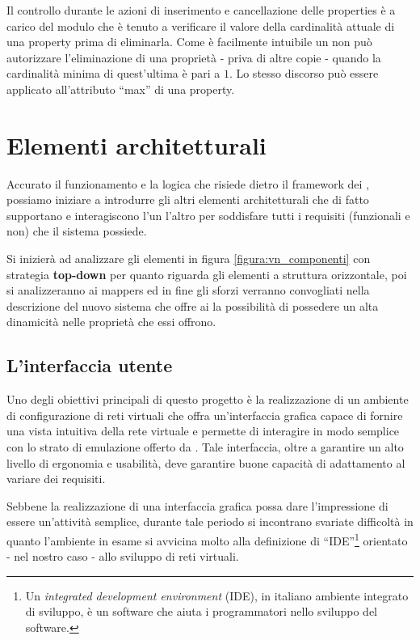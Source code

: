 Il controllo durante le azioni di inserimento e cancellazione delle properties è a carico del modulo che è tenuto a verificare il valore della cardinalità attuale di una property prima di eliminarla. Come è facilmente intuibile un \plugin{} non può autorizzare l'eliminazione di una proprietà - priva di altre copie - quando la cardinalità minima di quest'ultima è pari a $1$. Lo stesso discorso può essere applicato all'attributo ``max'' di una property.

\section{Elementi architetturali}
Accurato il funzionamento e la logica che risiede dietro il framework dei \plugin{}, possiamo iniziare a introdurre gli altri elementi architetturali che di fatto supportano e interagiscono l'un l'altro per soddisfare tutti i requisiti (funzionali e non) che il sistema possiede.

Si inizierà ad analizzare gli elementi in figura \ref{figura:vn_componenti} con strategia \textbf{top-down} per quanto riguarda gli elementi a struttura orizzontale, poi si analizzeranno ai mappers ed in fine gli sforzi verranno convogliati nella descrizione del nuovo sistema che offre ai \plugin{} la possibilità di possedere un alta dinamicità nelle proprietà che essi offrono.

\subsection{L'interfaccia utente}
Uno degli obiettivi principali di questo progetto è la realizzazione di un ambiente di configurazione di reti virtuali che offra un'interfaccia grafica capace di fornire una vista intuitiva della rete virtuale  e permette di interagire in modo semplice con lo strato di emulazione offerto da \netkit{}.
Tale interfaccia, oltre a garantire un alto livello di ergonomia e usabilità, deve garantire buone capacità di adattamento al variare dei requisiti.

Sebbene la realizzazione di una interfaccia grafica possa dare l'impressione di essere un'attività semplice, durante tale periodo si incontrano svariate difficoltà in quanto l'ambiente in esame si avvicina molto alla definizione di ``IDE''\footnote{Un \textit{integrated development environment} (IDE), in italiano ambiente integrato di sviluppo, è un software che aiuta i programmatori nello sviluppo del software.} orientato - nel nostro caso - allo sviluppo di reti virtuali.

